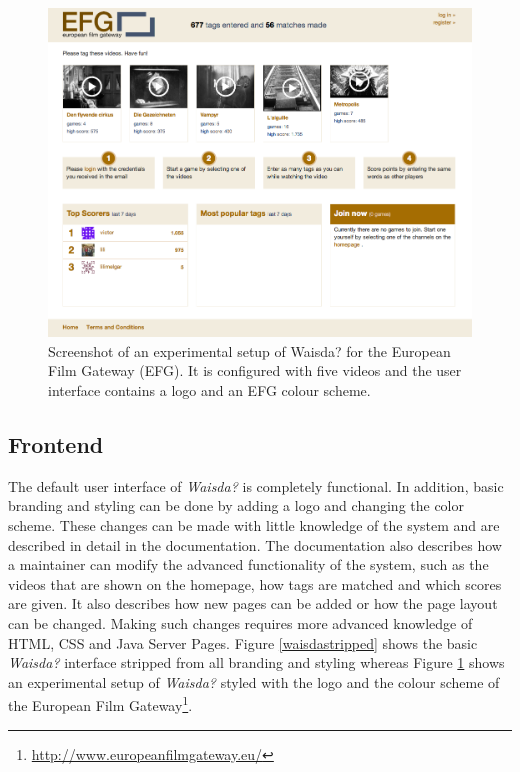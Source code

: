 \begin{figure}[t]
\centering
\includegraphics[width=\columnwidth]{figs/waisdaefgtheme} 
\caption{Screenshot of an experimental setup of Waisda? for the European Film Gateway (EFG). It is configured with five videos and the user interface contains a logo and an EFG colour scheme.}
\label{waisdaefgtheme}
\end{figure}

\subsection{Frontend}
The default user interface of \textit{Waisda?} is completely functional. In addition, basic branding and styling can be done by adding a logo and changing the color scheme. These changes can be made with little knowledge of the system and are described in detail in the documentation. The documentation also describes how a maintainer can modify the advanced functionality of the system, such as the videos that are shown on the homepage, how tags are matched and which scores are given. It also describes how new pages can be added or how the page layout can be changed. Making such changes requires more advanced knowledge of HTML, CSS and Java Server Pages. Figure \ref{waisdastripped} shows the basic \textit{Waisda?} interface stripped from all branding and styling whereas Figure \ref{waisdaefgtheme} shows an experimental setup of \textit{Waisda?} styled with the logo and the colour scheme of the European Film Gateway\footnote{\url{http://www.europeanfilmgateway.eu/}}.

